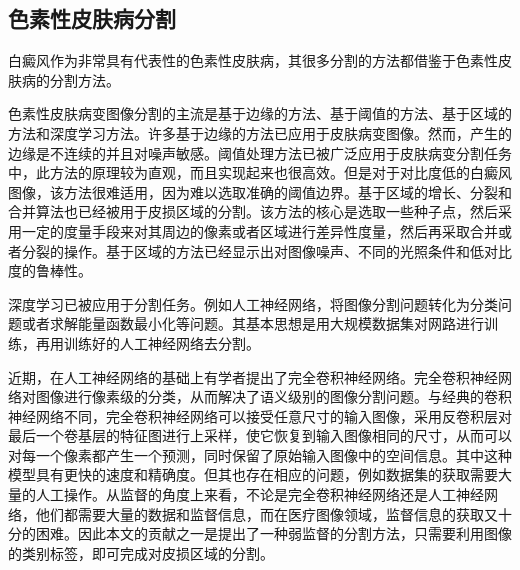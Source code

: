 \subsection{色素性皮肤病分割}
白癜风作为非常具有代表性的色素性皮肤病，其很多分割的方法都借鉴于色素性皮肤病的分割方法。

色素性皮肤病变图像分割的主流是基于边缘的方法、基于阈值的方法、基于区域的方法和深度学习方法。许多基于边缘的方法已应用于皮肤病变图像\cite {barcelos2009automatic,de2011skan}。然而，产生的边缘是不连续的并且对噪声敏感。阈值处理方法已被广泛应用于皮肤病变分割任务中\cite{norton2012three,abbas2013perceptually,cavalcanti2013coarse}，此方法的原理较为直观，而且实现起来也很高效。但是对于对比度低的白癜风图像，该方法很难适用，因为难以选取准确的阈值边界。基于区域的增长、分裂和合并算法也已经被用于皮损区域的分割\cite{castillejos2012wavelet, de2011skan, wong2011automatic}。该方法的核心是选取一些种子点，然后采用一定的度量手段来对其周边的像素或者区域进行差异性度量，然后再采取合并或者分裂的操作。基于区域的方法已经显示出对图像噪声、不同的光照条件和低对比度的鲁棒性。


深度学习\cite{2010模式识别, 2016机器学习}已被应用于分割任务。例如人工神经网络\cite {schaefer2011colour, rajab2004application,2010模式识别}，将图像分割问题转化为分类问题或者求解能量函数最小化等问题。其基本思想是用大规模数据集对网路进行训练，再用训练好的人工神经网络去分割。

近期，在人工神经网络的基础上有学者提出了完全卷积神经网络\cite{ 2018深度特征融合的图像语义分割, long2015fully, noh2015learning, ronneberger2015u}。完全卷积神经网络对图像进行像素级的分类，从而解决了语义级别的图像分割问题。与经典的卷积神经网络不同，完全卷积神经网络可以接受任意尺寸的输入图像，采用反卷积层对最后一个卷基层的特征图进行上采样，使它恢复到输入图像相同的尺寸，从而可以对每一个像素都产生一个预测，同时保留了原始输入图像中的空间信息。其中这种模型具有更快的速度和精确度。但其也存在相应的问题，例如数据集的获取需要大量的人工操作。从监督的角度上来看，不论是完全卷积神经网络还是人工神经网络，他们都需要大量的数据和监督信息，而在医疗图像领域，监督信息的获取又十分的困难。因此本文的贡献之一是提出了一种弱监督的分割方法，只需要利用图像的类别标签，即可完成对皮损区域的分割。

